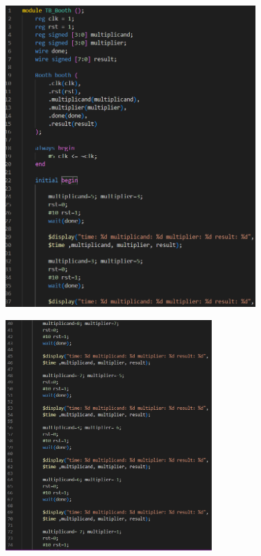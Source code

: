 \documentclass{article}
\begin{document}
\begin{figure}[H]
    \centering
    \includegraphics[width=0.85\textwidth]{TB_Booth1.png}
\end{figure}

\begin{figure}[H]
    \centering
    \includegraphics[width=0.7\textwidth]{TB_Booth2.png}
\end{figure}
\end{document}
